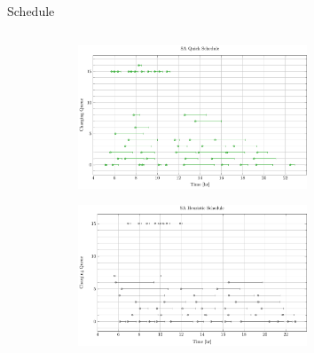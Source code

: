 \documentclass[aspectratio=169,dvipsnames]{beamer}
\begin{document}
\begin{frame}[label={sec:org797453d}]{Schedule}
\begin{columns}
\begin{column}{0.5\columnwidth}
\begin{figure}
\begin{subfigure}[t]{\textwidth}
\centering
    \includegraphics[width=0.75\textwidth]{img/sa-pap-paper-good/schedule-sa-quick}
\end{subfigure}
\begin{subfigure}[t]{\textwidth}
\centering
    \includegraphics[width=0.75\textwidth]{img/sa-pap-paper-good/schedule-sa-heuristic}
\end{subfigure}
\end{figure}
\end{column}
\end{columns}
\end{frame}
\end{document}
